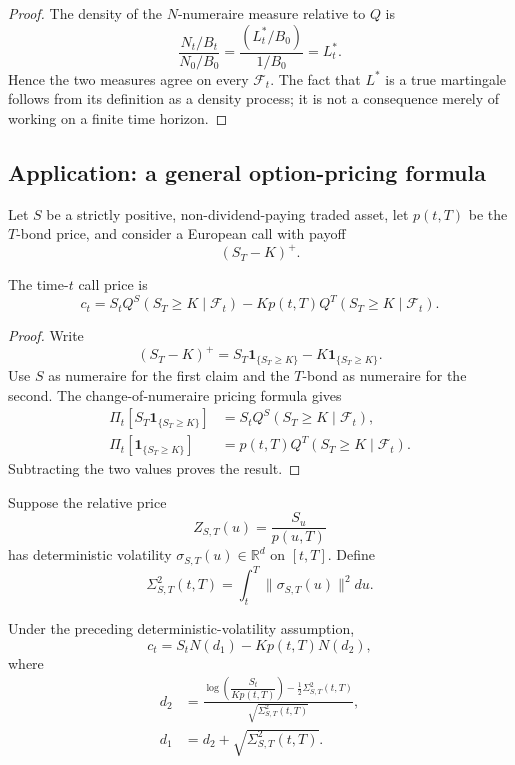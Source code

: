 \begin{proof}
The density of the $N$-numeraire measure relative to $Q$ is
\[
\frac{N_t/B_t}{N_0/B_0}
=\frac{(L_t^*/B_0)}{1/B_0}
=L_t^*.
\]
Hence the two measures agree on every $\mathcal{F}_t$. The fact that $L^*$ is a true martingale follows from its definition as a density process; it is not a consequence merely of working on a finite time horizon.
\end{proof}

\subsection{Application: a general option-pricing formula}

Let $S$ be a strictly positive, non-dividend-paying traded asset, let $p(t,T)$ be the $T$-bond price, and consider a European call with payoff
\[
(S_T-K)^+.
\]

\begin{prop}
The time-$t$ call price is
\[
\boxed{
c_t
=S_tQ^S(S_T\geq K\mid\mathcal{F}_t)
-Kp(t,T)Q^T(S_T\geq K\mid\mathcal{F}_t).}
\]
\end{prop}

\begin{proof}
Write
\[
(S_T-K)^+
=S_T\mathbf{1}_{\{S_T\geq K\}}
-K\mathbf{1}_{\{S_T\geq K\}}.
\]
Use $S$ as numeraire for the first claim and the $T$-bond as numeraire for the second. The change-of-numeraire pricing formula gives
\[
\begin{aligned}
\Pi_t\!\left[S_T\mathbf{1}_{\{S_T\geq K\}}\right]
&=S_tQ^S(S_T\geq K\mid\mathcal{F}_t),\\
\Pi_t\!\left[\mathbf{1}_{\{S_T\geq K\}}\right]
&=p(t,T)Q^T(S_T\geq K\mid\mathcal{F}_t).
\end{aligned}
\]
Subtracting the two values proves the result.
\end{proof}

Suppose the relative price
\[
Z_{S,T}(u)=\frac{S_u}{p(u,T)}
\]
has deterministic volatility $\sigma_{S,T}(u)\in\mathbb{R}^d$ on $[t,T]$. Define
\[
\Sigma_{S,T}^2(t,T)
=\int_t^T\|\sigma_{S,T}(u)\|^2du.
\]

\begin{thm}
Under the preceding deterministic-volatility assumption,
\[
c_t=S_tN(d_1)-Kp(t,T)N(d_2),
\]
where
\[
\begin{aligned}
d_2
&=\frac{
 \log\!\left(\dfrac{S_t}{Kp(t,T)}\right)
 -\frac12\Sigma_{S,T}^2(t,T)
}{\sqrt{\Sigma_{S,T}^2(t,T)}},\\[4pt]
d_1
&=d_2+\sqrt{\Sigma_{S,T}^2(t,T)}.
\end{aligned}
\]
\end{thm}

